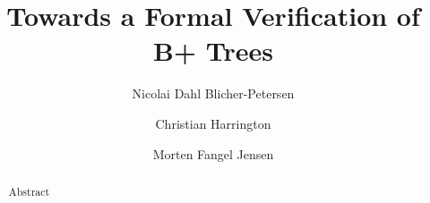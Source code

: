 \documentclass[oribibl]{llncs}
\begin{document}
\mainmatter
\title{Towards a Formal Verification of B+ Trees}
\author{Nicolai Dahl Blicher-Petersen \and Christian Harrington \and Morten Fangel Jensen \\
}

\maketitle

\begin{abstract}
Abstract

\end{abstract}





\newpage

\end{document}
